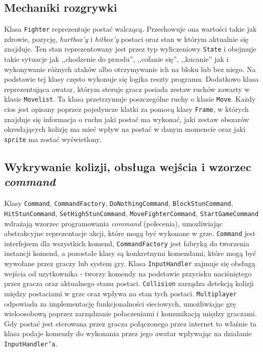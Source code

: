 \subsection{Mechaniki rozgrywki}
Klasa \texttt{Fighter} reprezentuje postać walczącą. Przechowuje ona wartości takie jak zdrowie, pozycję, \emph{hurtbox'y} i \emph{hitbox'y} postaci oraz stan w którym aktualnie się znajduje. Ten stan reprezentowany jest przez typ wyliczeniowy \texttt{State} i obejmuje takie sytuacje jak ,,chodzenie do przodu'', ,,cofanie się'', ,,kucanie'' jak i wykonywanie różnych ataków albo otrzymywanie ich na bloku lub bez niego. Na podstawie tej klasy często wykonuje się logika reszty programu. Dodatkowo klasa reprezentująca awatar, którym steruje gracz posiada zestaw ruchów zawarty w klasie \texttt{Movelist}. Ta klasa przetrzymuje poszczególne ruchy o klasie \texttt{Move}. Każdy cios jest opisany poprzez pojedyncze klatki za pomocą klasy \texttt{Frame}, w których znajduje się informacja o ruchu jaki postać ma wykonać, jaki zestaw obszarów okreslających kolizję ma mieć wpływ na postać w danym momencie oraz jaki \texttt{sprite} ma zostać wyświetlony.

\subsection{Wykrywanie kolizji, obsługa wejścia i wzorzec \emph{command} \cite{GPP}}
Klasy \texttt{Command}, \texttt{CommandFactory}, \texttt{DoNothingCommand}, \texttt{BlockStunCommand}, \texttt{HitStunCommand}, \texttt{SetHighStunCommand}, \texttt{MoveFighterCommand}, \texttt{StartGameCommand} wdrażają wzorzec programowania \emph{command} (polecenia), umozliwiając abstrakcyjne reprezentacje akcji, które mogą być wykonane w grze. \texttt{Command} jest interfejsem dla wszystkich komend, \texttt{CommandFactory} jest fabryką do tworzenia instancji komend, a pozostałe klasy są konkretnymi komendami, które mogą być wywołane przez graczy lub system gry. Klasa \texttt{InputHandler} zajmuje się obsługą wejścia od uzytkownika - tworzy komendy na podstawie przycisku naciśniętego przez gracza oraz aktualnego stanu postaci. \texttt{Collision} zarządza detekcją kolizji między postaciami w grze oraz wpływa na stan tych postaci. \texttt{Multiplayer} odpowiada za implementację funkcjonalności sieciowych, umożliwiając grę wieloosobową poprzez zarządzanie połaczeniami i komunikacją między graczami. Gdy postać jest sterowana przez gracza połączonego przez internet to właśnie ta klasa podaje komendy do wykonania przez jego awatar wpływając na działanie \texttt{InputHandler'a}.

